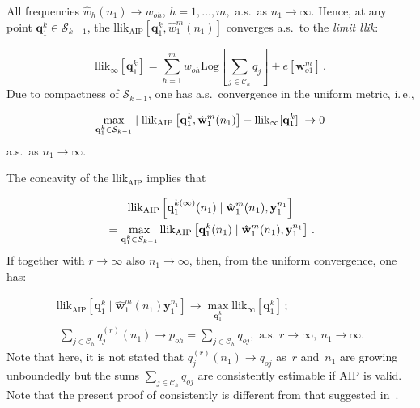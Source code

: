 \begin{multicols}{2}
\vspace*{9pt}

\addtocounter{figure}{1}
 
   
      

 All frequencies $\hat{w}_h(n_1)\to w_{oh}$, $h=1, \ldots, m,$ a.s.\ 
 as $n_1\to\infty.$ Hence,
 at any point $\mathbf{q}_1^k \in\mathcal{S}_{k-1}$, the llik$_{\mathrm{AIP}} 
 [\mathbf{q}_1^k, \hat{w}_1^m (n_1) ]$
 converges a.s.\ to the \textit{limit llik}:
 
 \noindent
$$ 
\mathrm{llik}_{\infty } \left[\mathbf{q}_1^k\right] =
\sum\limits_{h=1}^m  w_{oh} \mathrm{Log} \left [ \sum\limits_{j\in\mathcal{C}_h} q_j\right ]
 +e\left[\mathbf{w}_{o1}^m \right]\,.
 $$
 Due to compactness of $\mathcal{S}_{k-1}$, one has a.s.\ convergence in the uniform metric, i.\,e.,
 
 \noindent
$$
\max\limits_{\mathbf{q}_1^k\in\mathcal{S}_{k-1}} \mid 
\mathrm{llik}_{\mathrm{AIP}} \left[\mathbf{q}_1^k, \hat{\mathbf{w}}_1^m (n_1)\right] - 
\mathrm{llik}_{\infty } [{\bf q}_1^k ] \mid \to 0
$$
 a.s.\ as $ n_1\to\infty$.

   The concavity of the llik$_{\mathrm{AIP}}$  implies that
   
   \noindent
\begin{multline*}
\mathrm{llik}_{\mathrm{AIP}} \left[
{\bf q}_1^{k(\infty )}(n_1)\mid  \hat{\bf w}_1^m (n_1), {\bf y}_1^{n_1}\right]\\
{}=
\max\limits_{\mathbf{q}_1^k\in\mathcal{S}_{k-1}} \mathrm{llik}_{\mathrm{AIP}} 
\left[\mathbf{q}_1^{k}(n_1)\mid  \hat{\mathbf{w}}_1^m (n_1), \mathbf{y}_1^{n_1}\right]\,.
\end{multline*}
   If together with $r\to\infty $ also $n_1\to\infty$, 
   then, from the uniform  convergence, one has:
   
   \noindent
\begin{gather*}
   \mathrm{llik}_{\mathrm{AIP}}\left[
   \mathbf{q}_1^{k}\mid  \hat{\mathbf{w}}_1^m (n_1) \mathbf{y}_1^{n_1}\right]\to 
   \max\limits_{\mathbf{q}_1^k} \mathrm{llik}_\infty \left[\mathbf{q}_1^k \right]\,;\\
\  \sum\limits_{j\in\mathcal{C}_h} q_j^{(r)}(n_1)\to p_{o h} =
     \sum\limits_{j\in\mathcal{C}_h} q_{oj}, 
\mbox{ a.s.\ } r\to\infty,\  n_1\to\infty .
\end{gather*}
 Note that here, it is not stated that  $ q_j^{(r)}(n_1) \to q_{oj}$ as~$r$ 
 and~$n_1$ are growing unboundedly but
 the sums $\sum_{j\in\mathcal{C}_h} q_{oj}$ are consistently estimable if AIP is valid.
Note that the present proof of consistently is different from that
suggested in~\cite{BK:JM03}.


\end{multicols}
